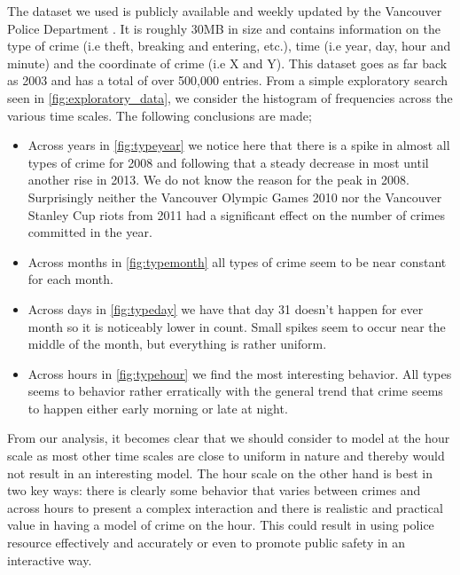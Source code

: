 \documentclass{article}
\begin{document}
The dataset we used is publicly available and weekly updated by the Vancouver Police Department \cite{Dataset}. It is roughly 30MB in size and contains information on the type of crime (i.e theft, breaking and entering, etc.), time (i.e year, day, hour and minute) and the coordinate of crime (i.e X and Y). This dataset goes as far back as 2003 and has a total of over 500,000 entries. From a simple exploratory search seen in \cref{fig:exploratory_data}, we consider the histogram of frequencies across the various time scales. The following conclusions are made;
\begin{itemize}
\item  Across years in \cref{fig:typeyear} we notice here that there is a spike in almost all types of crime for 2008 and following that a steady decrease in most until another rise in 2013. We do not know the reason for the peak in 2008. Surprisingly neither the Vancouver Olympic Games 2010 nor the Vancouver Stanley Cup riots from 2011 had a significant effect on the number of crimes committed in the year.
\item Across months in \cref{fig:typemonth} all types of crime seem to be near constant for each month.
\item Across days in \cref{fig:typeday} we have that day 31 doesn't happen for ever month so it is noticeably lower in count. Small spikes seem to occur near the middle of the month, but everything is rather uniform. 
\item Across hours in \cref{fig:typehour} we find the most interesting behavior. All types seems to behavior rather erratically with the general trend that crime seems to happen either early morning or late at night.
\end{itemize}

From our analysis, it becomes clear that we should consider to model at the hour scale as most other time scales are close to uniform in nature and thereby would not result in an interesting model. The hour scale on the other hand is best in two key ways: there is clearly some behavior that varies between crimes and across hours to present a complex interaction and there is realistic and practical value in having a model of crime on the hour. This could result in using police resource effectively and accurately or even to promote public safety in an interactive way.
\end{document}
